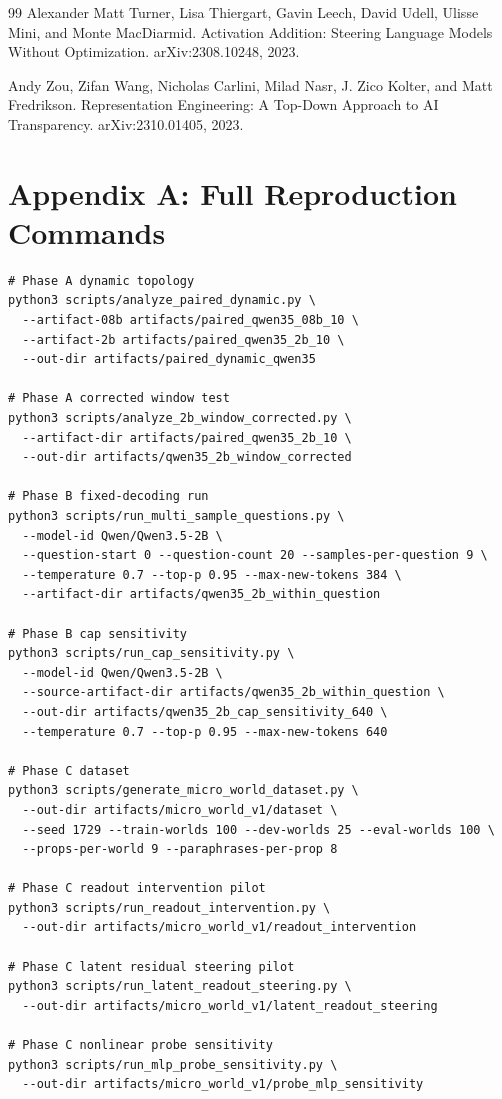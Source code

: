 \documentclass[11pt]{article}
\begin{document}
\begin{thebibliography}{99}
Alexander Matt Turner, Lisa Thiergart, Gavin Leech, David Udell, Ulisse Mini, and Monte MacDiarmid.
\newblock Activation Addition: Steering Language Models Without Optimization.
\newblock arXiv:2308.10248, 2023.

Andy Zou, Zifan Wang, Nicholas Carlini, Milad Nasr, J. Zico Kolter, and Matt Fredrikson.
\newblock Representation Engineering: A Top-Down Approach to AI Transparency.
\newblock arXiv:2310.01405, 2023.

\end{thebibliography}

\appendix
\section{Appendix A: Full Reproduction Commands}
\begin{verbatim}
# Phase A dynamic topology
python3 scripts/analyze_paired_dynamic.py \
  --artifact-08b artifacts/paired_qwen35_08b_10 \
  --artifact-2b artifacts/paired_qwen35_2b_10 \
  --out-dir artifacts/paired_dynamic_qwen35

# Phase A corrected window test
python3 scripts/analyze_2b_window_corrected.py \
  --artifact-dir artifacts/paired_qwen35_2b_10 \
  --out-dir artifacts/qwen35_2b_window_corrected

# Phase B fixed-decoding run
python3 scripts/run_multi_sample_questions.py \
  --model-id Qwen/Qwen3.5-2B \
  --question-start 0 --question-count 20 --samples-per-question 9 \
  --temperature 0.7 --top-p 0.95 --max-new-tokens 384 \
  --artifact-dir artifacts/qwen35_2b_within_question

# Phase B cap sensitivity
python3 scripts/run_cap_sensitivity.py \
  --model-id Qwen/Qwen3.5-2B \
  --source-artifact-dir artifacts/qwen35_2b_within_question \
  --out-dir artifacts/qwen35_2b_cap_sensitivity_640 \
  --temperature 0.7 --top-p 0.95 --max-new-tokens 640

# Phase C dataset
python3 scripts/generate_micro_world_dataset.py \
  --out-dir artifacts/micro_world_v1/dataset \
  --seed 1729 --train-worlds 100 --dev-worlds 25 --eval-worlds 100 \
  --props-per-world 9 --paraphrases-per-prop 8

# Phase C readout intervention pilot
python3 scripts/run_readout_intervention.py \
  --out-dir artifacts/micro_world_v1/readout_intervention

# Phase C latent residual steering pilot
python3 scripts/run_latent_readout_steering.py \
  --out-dir artifacts/micro_world_v1/latent_readout_steering

# Phase C nonlinear probe sensitivity
python3 scripts/run_mlp_probe_sensitivity.py \
  --out-dir artifacts/micro_world_v1/probe_mlp_sensitivity
\end{verbatim}
\end{document}
